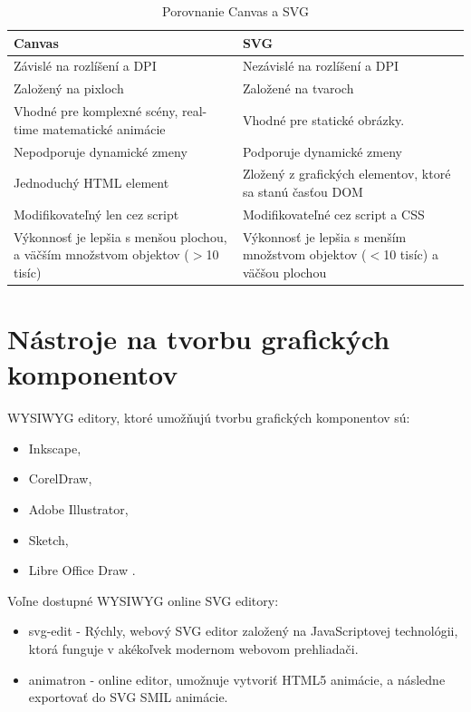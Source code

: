  \begin{table}[H]
 \centering
	 \begin{tabular}{|p{7.4cm}|p{7.4cm} |}
		\hline \textbf{Canvas} & \textbf{SVG} \\
		\hline Závislé na rozlíšení a \acs{DPI} & Nezávislé na rozlíšení a DPI \\ 
		\hline  Založený na pixloch & Založené na tvaroch \\ 
		\hline Vhodné pre komplexné scény, real-time matematické animácie & Vhodné pre statické obrázky.\\
		\hline Nepodporuje dynamické zmeny & Podporuje dynamické zmeny \\
		\hline Jednoduchý HTML element & Zložený z grafických elementov, ktoré sa stanú časťou DOM \\
		\hline Modifikovateľný len cez script & Modifikovateľné cez script a CSS \\
		\hline Výkonnosť je lepšia s menšou plochou, a väčším množstvom objektov ($>$10 tisíc) &  Výkonnosť je lepšia s menším množstvom objektov ($<$10 tisíc) a väčšou plochou\\ 
		\hline
	 \end{tabular} 
 \caption{Porovnanie Canvas a SVG}
 \label{canvas:SVG}
\end{table}
 
\section{Nástroje na tvorbu grafických komponentov}

\acs{WYSIWYG} editory, ktoré umožňujú tvorbu grafických komponentov sú: 

\begin{itemize}
	\item Inkscape,
	\item CorelDraw, 
	\item  Adobe Illustrator, 
	\item Sketch, 
	\item Libre Office Draw .
\end{itemize}

Voľne dostupné \acs{WYSIWYG} online SVG editory: 
\begin{itemize}
	
	\item svg-edit - Rýchly, webový SVG editor založený na JavaScriptovej technológii, ktorá funguje v akékoľvek modernom webovom prehliadači. \cite{svg-edit}
    \item animatron - online editor, umožnuje vytvoriť HTML5 animácie, a následne exportovať do SVG \acs{SMIL} animácie.\cite{animatron}
	
\end{itemize}


